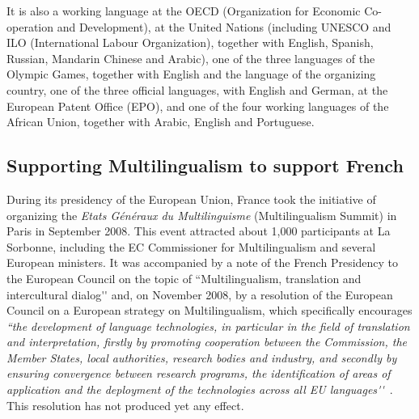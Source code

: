 \begin{multicols}{2}
It is also a working language at the OECD (Organization for Economic
Co-operation and Development), at the United Nations (including UNESCO
and ILO (International Labour Organization), together with English,
Spanish, Russian, Mandarin Chinese and Arabic), one of the three
languages of the Olympic Games, together with English and the language
of the organizing country, one of the three official languages, with
English and German, at the European Patent Office (EPO), and one of
the four working languages of the African Union, together with Arabic,
English and Portuguese.

\subsection{Supporting Multilingualism to support French}

During its presidency of the European Union, France took the
initiative of organizing the {\em Etats Généraux du Multilinguisme}
(Multilingualism Summit) in Paris in September 2008. This event
attracted about 1,000 participants at La Sorbonne, including the EC
Commissioner for Multilingualism and several European ministers. It
was accompanied by a note of the French Presidency to the European
Council on the topic of ``Multilingualism, translation and
intercultural dialog{\mbox '}{\mbox '} and, on November 2008, by a
resolution of the European Council on a European strategy on
Multilingualism, which specifically encourages {\em ``the development
  of language technologies, in particular in the field of translation
  and interpretation, firstly by promoting cooperation between the
  Commission, the Member States, local authorities, research bodies
  and industry, and secondly by ensuring convergence between research
  programs, the identification of areas of application and the
  deployment of the technologies across all EU languages{\mbox
    '}{\mbox '}}~\cite{eurlex}. This resolution has not produced yet
any effect.


\end{multicols}
